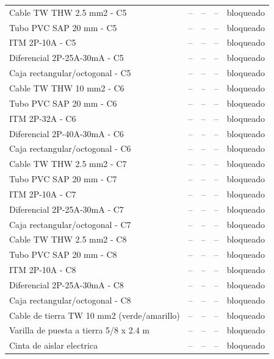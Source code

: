 \documentclass[11pt,a4paper]{article}
\begin{document}
\begin{longtable}{p{} p{} r r p{}}
Cable TW THW 2.5 mm2 - C5 & -- & -- & -- & bloqueado \\
Tubo PVC SAP 20 mm - C5 & -- & -- & -- & bloqueado \\
ITM 2P-10A - C5 & -- & -- & -- & bloqueado \\
Diferencial 2P-25A-30mA - C5 & -- & -- & -- & bloqueado \\
Caja rectangular/octogonal - C5 & -- & -- & -- & bloqueado \\
Cable TW THW 10 mm2 - C6 & -- & -- & -- & bloqueado \\
Tubo PVC SAP 20 mm - C6 & -- & -- & -- & bloqueado \\
ITM 2P-32A - C6 & -- & -- & -- & bloqueado \\
Diferencial 2P-40A-30mA - C6 & -- & -- & -- & bloqueado \\
Caja rectangular/octogonal - C6 & -- & -- & -- & bloqueado \\
Cable TW THW 2.5 mm2 - C7 & -- & -- & -- & bloqueado \\
Tubo PVC SAP 20 mm - C7 & -- & -- & -- & bloqueado \\
ITM 2P-10A - C7 & -- & -- & -- & bloqueado \\
Diferencial 2P-25A-30mA - C7 & -- & -- & -- & bloqueado \\
Caja rectangular/octogonal - C7 & -- & -- & -- & bloqueado \\
Cable TW THW 2.5 mm2 - C8 & -- & -- & -- & bloqueado \\
Tubo PVC SAP 20 mm - C8 & -- & -- & -- & bloqueado \\
ITM 2P-10A - C8 & -- & -- & -- & bloqueado \\
Diferencial 2P-25A-30mA - C8 & -- & -- & -- & bloqueado \\
Caja rectangular/octogonal - C8 & -- & -- & -- & bloqueado \\
Cable de tierra TW 10 mm2 (verde/amarillo) & -- & -- & -- & bloqueado \\
Varilla de puesta a tierra 5/8 x 2.4 m & -- & -- & -- & bloqueado \\
Cinta de aislar electrica & -- & -- & -- & bloqueado \\
\bottomrule\end{longtable}
\end{document}

